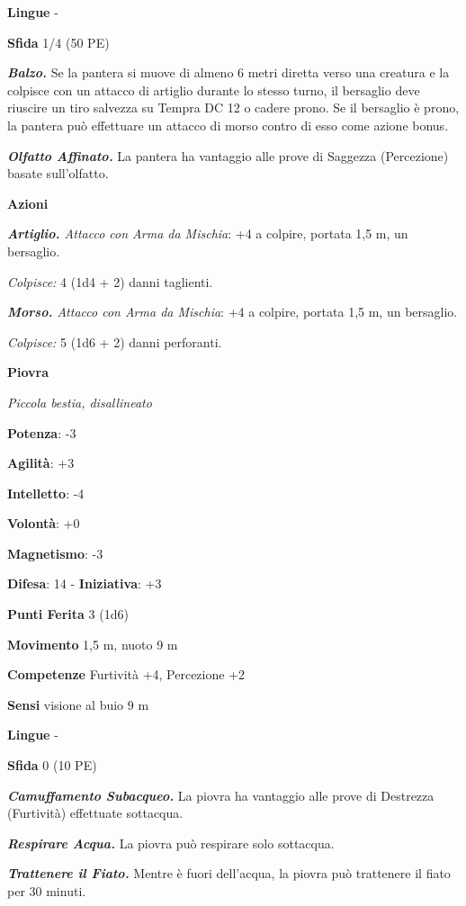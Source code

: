 \begin{multicols}{2}
\textbf{Lingue} -

\textbf{Sfida} 1/4 (50 PE)

\emph{\textbf{Balzo.}} Se la pantera si muove di almeno 6 metri diretta
verso una creatura e la colpisce con un attacco di artiglio durante lo
stesso turno, il bersaglio deve riuscire un tiro salvezza su Tempra DC 12
o cadere prono. Se il bersaglio è prono, la pantera può effettuare un
attacco di morso contro di esso come azione bonus.

\emph{\textbf{Olfatto Affinato.}} La pantera ha vantaggio alle prove di
Saggezza (Percezione) basate sull'olfatto.

\textbf{Azioni}

\emph{\textbf{Artiglio.} Attacco con Arma da Mischia}: +4 a colpire,
portata 1,5 m, un bersaglio.

\emph{Colpisce:} 4 (1d4 + 2) danni taglienti.

\emph{\textbf{Morso.} Attacco con Arma da Mischia}: +4 a colpire,
portata 1,5 m, un bersaglio.

\emph{Colpisce:} 5 (1d6 + 2) danni perforanti.



\textbf{Piovra}

\emph{Piccola bestia, disallineato}

\textbf{Potenza}: -3

\textbf{Agilità}: +3

\textbf{Intelletto}: -4

\textbf{Volontà}: +0

\textbf{Magnetismo}: -3

\textbf{Difesa}: 14 - \textbf{Iniziativa}: +3

\textbf{Punti Ferita} 3 (1d6)

\textbf{Movimento} 1,5 m, nuoto 9 m

\textbf{Competenze} Furtività +4, Percezione +2

\textbf{Sensi} visione al buio 9 m

\textbf{Lingue} -

\textbf{Sfida} 0 (10 PE)

\emph{\textbf{Camuffamento Subacqueo.}} La piovra ha vantaggio alle
prove di Destrezza (Furtività) effettuate sottacqua.

\emph{\textbf{Respirare Acqua.}} La piovra può respirare solo sottacqua.

\emph{\textbf{Trattenere il Fiato.}} Mentre è fuori dell'acqua, la
piovra può trattenere il fiato per 30 minuti.


\end{multicols}
